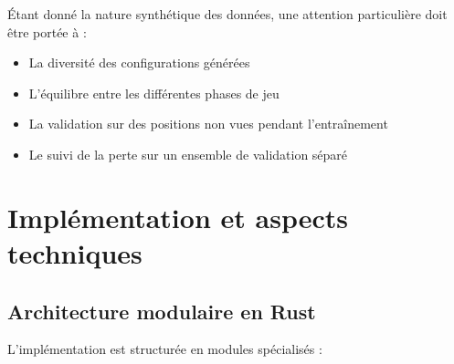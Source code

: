 \documentclass[12pt,a4paper]{report}
\numberwithin{equation}{section}
\begin{document}
\begin{remark}
Étant donné la nature synthétique des données, une attention particulière doit être portée à :
\begin{itemize}
  \item La diversité des configurations générées
  \item L'équilibre entre les différentes phases de jeu
  \item La validation sur des positions non vues pendant l'entraînement
  \item Le suivi de la perte sur un ensemble de validation séparé
\end{itemize}
\end{remark}

\chapter{Implémentation et aspects techniques}

\section{Architecture modulaire en Rust}

L'implémentation est structurée en modules spécialisés :
\end{document}
